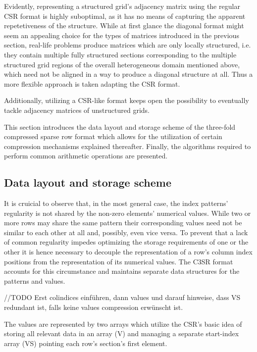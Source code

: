 \documentclass{article}
\begin{document}
  Evidently, representing a structured grid's adjacency matrix using the regular CSR format is highly suboptimal, as it has no means of capturing the apparent repetetiveness of the structure. While at first glance the diagonal format might seem an appealing choice for the types of matrices introduced in the previous section, real-life problems produce matrices which are only locally structured, i.e. they contain multiple fully structured sections corresponding to the multiple structured grid regions of the overall heterogeneous domain mentioned above, which need not be aligned in a way to produce a diagonal structure at all. Thus a more flexible approach is taken adapting the CSR format.

  Additionally, utilizing a CSR-like format keeps open the possibility to eventually tackle adjacency matrices of
  unstructured grids.

  This section introduces the data layout and storage scheme of the three-fold compressed sparse row format which allows
  for the utilization of certain compression mechanisms explained thereafter. Finally, the algorithms required to
  perform common arithmetic operations are presented.

  \subsection{Data layout and storage scheme}


    It is cruicial to observe that, in the most general case, the index patterns' regularity is not shared by the non-zero elements' numerical values. While two or more rows may share the same pattern their corresponding values need not be similar to each other at all and, possibly, even vice versa. To prevent that a lack of common regularity impedes optimizing the storage requirements of one or the other it is hence necessary to decouple the representation of a row's column index positions from the representation of its numerical values. The C3SR format accounts for this circumstance and maintains separate data structures for the patterns and values.

    //TODO Erst colindices einführen, dann values und darauf hinweise, dass VS redundant ist, falls keine values
    compression erwünscht ist.

    The values are represented by two arrays which utilize the CSR's basic idea of storing all relevant data in an array (V) and managing a separate start-index array (VS) pointing each row's section's first element.
\end{document}

